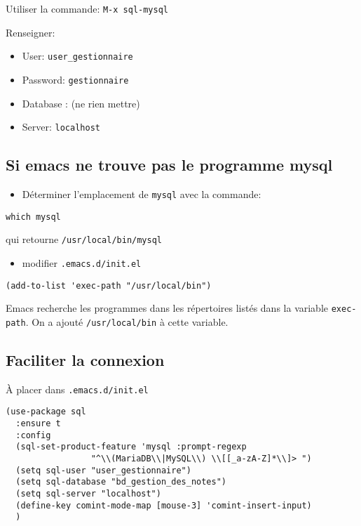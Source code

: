 \documentclass[11pt]{article}
\begin{document}
Utiliser la commande: \texttt{M-x sql-mysql}

Renseigner:
\begin{itemize}
\item User: \texttt{user\_gestionnaire}
\item Password: \texttt{gestionnaire}
\item Database : (ne rien mettre)
\item Server: \texttt{localhost}
\end{itemize}

\subsection{Si emacs ne trouve pas le programme mysql}
\label{sec:orgc4f52cd}
\begin{itemize}
\item Déterminer l'emplacement de \texttt{mysql} avec la commande:
\end{itemize}
\begin{verbatim}
which mysql
\end{verbatim}
qui retourne \texttt{/usr/local/bin/mysql}

\begin{itemize}
\item modifier \texttt{.emacs.d/init.el}
\end{itemize}

\begin{verbatim}
(add-to-list 'exec-path "/usr/local/bin")
\end{verbatim}

Emacs recherche les programmes dans les répertoires listés dans la variable \texttt{exec-path}. On a ajouté  \texttt{/usr/local/bin} à cette variable.

\subsection{Faciliter la connexion}
\label{sec:org404b239}
À placer dans \texttt{.emacs.d/init.el}
\begin{verbatim}
(use-package sql
  :ensure t
  :config
  (sql-set-product-feature 'mysql :prompt-regexp 
                 "^\\(MariaDB\\|MySQL\\) \\[[_a-zA-Z]*\\]> ")
  (setq sql-user "user_gestionnaire")
  (setq sql-database "bd_gestion_des_notes")
  (setq sql-server "localhost")
  (define-key comint-mode-map [mouse-3] 'comint-insert-input)
  )
\end{verbatim}
\end{document}
